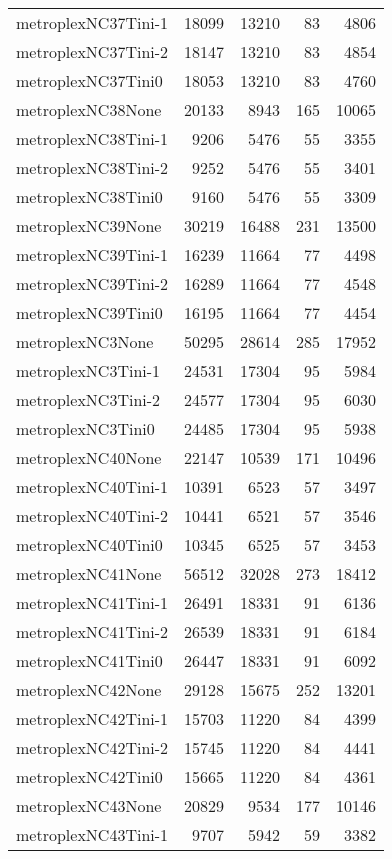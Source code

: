 \begin{longtable}{lrrrr}
metroplexNC37Tini-1 & 18099 & 13210 & 83 & 4806 \\
metroplexNC37Tini-2 & 18147 & 13210 & 83 & 4854 \\
metroplexNC37Tini0 & 18053 & 13210 & 83 & 4760 \\
metroplexNC38None & 20133 & 8943 & 165 & 10065 \\
metroplexNC38Tini-1 & 9206 & 5476 & 55 & 3355 \\
metroplexNC38Tini-2 & 9252 & 5476 & 55 & 3401 \\
metroplexNC38Tini0 & 9160 & 5476 & 55 & 3309 \\
metroplexNC39None & 30219 & 16488 & 231 & 13500 \\
metroplexNC39Tini-1 & 16239 & 11664 & 77 & 4498 \\
metroplexNC39Tini-2 & 16289 & 11664 & 77 & 4548 \\
metroplexNC39Tini0 & 16195 & 11664 & 77 & 4454 \\
metroplexNC3None & 50295 & 28614 & 285 & 17952 \\
metroplexNC3Tini-1 & 24531 & 17304 & 95 & 5984 \\
metroplexNC3Tini-2 & 24577 & 17304 & 95 & 6030 \\
metroplexNC3Tini0 & 24485 & 17304 & 95 & 5938 \\
metroplexNC40None & 22147 & 10539 & 171 & 10496 \\
metroplexNC40Tini-1 & 10391 & 6523 & 57 & 3497 \\
metroplexNC40Tini-2 & 10441 & 6521 & 57 & 3546 \\
metroplexNC40Tini0 & 10345 & 6525 & 57 & 3453 \\
metroplexNC41None & 56512 & 32028 & 273 & 18412 \\
metroplexNC41Tini-1 & 26491 & 18331 & 91 & 6136 \\
metroplexNC41Tini-2 & 26539 & 18331 & 91 & 6184 \\
metroplexNC41Tini0 & 26447 & 18331 & 91 & 6092 \\
metroplexNC42None & 29128 & 15675 & 252 & 13201 \\
metroplexNC42Tini-1 & 15703 & 11220 & 84 & 4399 \\
metroplexNC42Tini-2 & 15745 & 11220 & 84 & 4441 \\
metroplexNC42Tini0 & 15665 & 11220 & 84 & 4361 \\
metroplexNC43None & 20829 & 9534 & 177 & 10146 \\
metroplexNC43Tini-1 & 9707 & 5942 & 59 & 3382 \\

\end{longtable}
